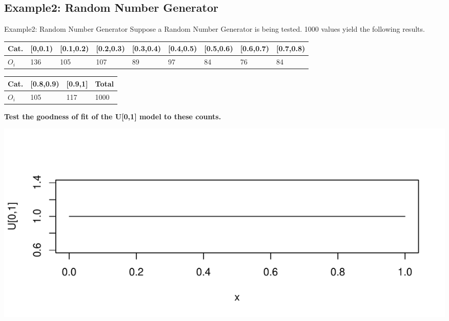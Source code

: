 \documentclass[t,xcolor=pdftex,dvipsnames,table]{beamer}\usepackage[]{graphicx}\usepackage[]{color}
\makeatletter
\def\maxwidth{ %
  \ifdim\Gin@nat@width>\linewidth
    \linewidth
  \else
    \Gin@nat@width
  \fi
}
\newenvironment{knitrout}{}{} %
\makeatother
\begin{document}
\subsection[GoodnessofFit]{Example2: Random Number Generator}
\begin{frame}[fragile]{Example2: Random Number Generator}
Suppose a Random Number Generator is being tested. 1000 values yield the following results. \\

\vspace{.5cm}
{\tiny 
\begin{tabular}{l|llllllll}  \hline
Cat. & [0,0.1) &  [0.1,0.2) & [0.2,0.3) & [0.3,0.4) & [0.4,0.5) & [0.5,0.6) & [0.6,0.7) & [0.7,0.8)  \\ \hline
$O_{i}$ & 136 & 105 & 107 & 89 & 97 & 84 & 76 & 84    \\ \hline
\end{tabular}
}

\vspace{.5cm}
{\tiny 
\begin{tabular}{l|lll}  \hline
Cat. & [0.8,0.9) &  [0.9,1] & Total \\ \hline
$O_{i}$ & 105  & 117  & 1000      \\ \hline
\end{tabular}
}

\vspace{.5cm}
{\bf Test the goodness of fit of the U[0,1] model to these counts.}

\begin{knitrout}
\color{fgcolor}
\includegraphics[width=\maxwidth]{figure/unnamed-chunk-147-1} 

\end{knitrout}
\end{frame}
\end{document}
